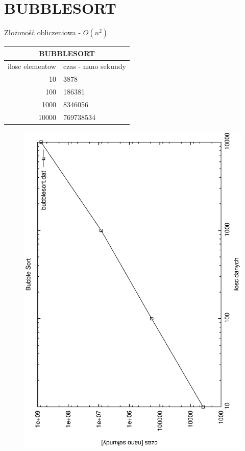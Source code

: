 \documentclass[a4paper,11pt]{report}
\begin{document}
\section{BUBBLESORT}

Złożoność obliczeniowa - $O(n^{2})$
  
\begin{tabular}{|rl|}
\hline
\multicolumn{2}{|c|}{BUBBLESORT}\\
\hline
ilosc elementow & czas - nano sekundy\\
\hline
10&3878\\
100&186381\\
1000&8346056\\
10000&769738534\\
\hline
\end{tabular}

\begin{figure}
  \begin{center}
    \includegraphics{wykresy/bubblesort.eps}
    \caption{}
    \label{fig:}
  \end{center}
\end{figure}
\end{document}

